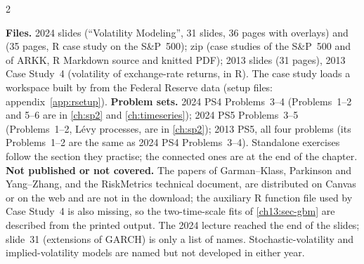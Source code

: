 \begin{paracol}{2}
\begin{sources}
\smallskip
\textbf{Files.} 2024 slides  (``Volatility Modeling'', 31 slides, 36 pages with overlays) and  (35 pages, R case study on the S\&P~500); zip  (case studies of the S\&P~500 and of ARKK, R Markdown source and knitted PDF); 2013 slides  (31 pages), 2013 Case Study~4  (volatility of exchange-rate returns, in R). The case study loads a workspace built by  from the Federal Reserve data  (setup files: appendix~\ref{app:rsetup}).
\textbf{Problem sets.} 2024 PS4 Problems~3--4 (Problems~1--2 and 5--6 are in \cref{ch:sp2} and \cref{ch:timeseries}); 2024 PS5 Problems~3--5 (Problems~1--2, L\'evy processes, are in \cref{ch:sp2}); 2013 PS5, all four problems (its Problems~1--2 are the same as 2024 PS4 Problems~3--4). Standalone exercises follow the section they practise; the connected ones are at the end of the chapter.
\textbf{Not published or not covered.} The papers of Garman--Klass, Parkinson and Yang--Zhang, and the RiskMetrics technical document, are distributed on Canvas or on the web and are not in the download; the auxiliary R function file  used by Case Study~4 is also missing, so the two-time-scale fits of \cref{ch13:sec-gbm} are described from the printed output. The 2024 lecture reached the end of the slides; slide~31 (extensions of GARCH) is only a list of names. Stochastic-volatility and implied-volatility models are named but not developed in either year.
\end{sources}


\end{paracol}
